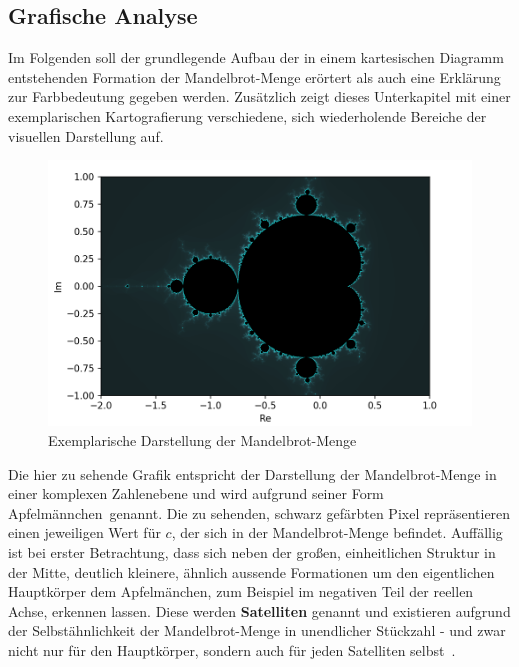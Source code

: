 \subsection{Grafische Analyse}\label{subsec:graphical-analysis}

Im Folgenden soll der grundlegende Aufbau der in einem kartesischen Diagramm
entstehenden Formation der Mandelbrot-Menge erörtert als auch eine
Erklärung zur Farbbedeutung gegeben werden.
Zusätzlich zeigt dieses Unterkapitel mit einer exemplarischen Kartografierung
verschiedene, sich wiederholende Bereiche der visuellen Darstellung auf.

\begin{figure}[h!]
  \centering
  \includegraphics[width=\textwidth]{images/mandelbrotImage}
  \caption[Caption for LOF]{
    Exemplarische Darstellung der Mandelbrot-Menge\footnotemark
  }
  \label{fig:mandelbrot-set}
\end{figure}

Die hier zu sehende Grafik entspricht der Darstellung der Mandelbrot-Menge
in einer komplexen Zahlenebene und wird aufgrund seiner Form
\glqq Apfelm\"annchen\grqq~genannt.
Die zu sehenden, schwarz gefärbten Pixel repräsentieren einen
jeweiligen Wert für $c$, der sich in der Mandelbrot-Menge befindet.
Auffällig ist bei erster Betrachtung, dass sich neben der großen,
einheitlichen Struktur in der Mitte,
deutlich kleinere, ähnlich aussende Formationen um den eigentlichen Hauptkörper
dem Apfelm\"anchen, zum Beispiel im negativen Teil der reellen Achse,
erkennen lassen.
Diese werden \textbf{Satelliten} genannt und existieren aufgrund der Selbstähnlichkeit
der Mandelbrot-Menge in unendlicher Stückzahl - und zwar nicht nur für den Hauptkörper,
sondern auch für jeden Satelliten selbst~\cite{lomonaco_quasi-conformal_2018}.

